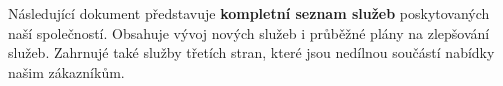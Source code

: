 \documentclass[11pt, a4paper, titlepage]{article}
\begin{document}
	\vspace{0.5em}

	\noindent\makebox[\linewidth]{\rule{17.5cm}{0.4pt}}

	\vspace{0.5em}

	\noindent Následující dokument představuje \textbf{kompletní seznam služeb} poskytovaných naší společností. Obsahuje vývoj nových služeb i průběžné plány na zlepšování služeb. Zahrnujé také služby třetích stran, které jsou nedílnou součástí nabídky našim zákazníkům. 

	\noindent\makebox[\linewidth]{\rule{17.5cm}{0.4pt}}
\end{document}

